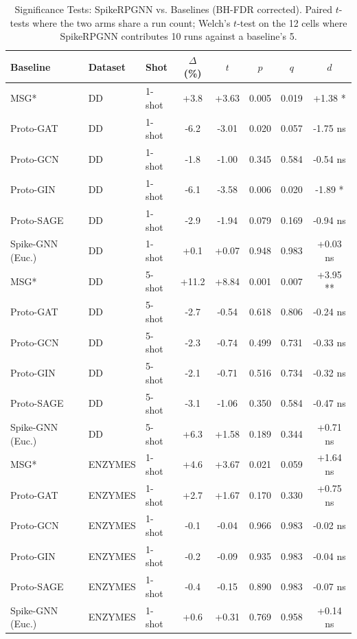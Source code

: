 \begin{table}[htbp]
\caption{Significance Tests: SpikeRPGNN vs. Baselines (BH-FDR corrected). Paired $t$-tests where the two arms share a run count; Welch's $t$-test on the 12 cells where SpikeRPGNN contributes 10 runs against a baseline's 5.}
\label{tab:significance}
\centering \scriptsize
\begin{tabular*}{\tblwidth}{@{} LLLccccc @{}}
\toprule
\textbf{Baseline} & \textbf{Dataset} & \textbf{Shot} & $\Delta$(\%) & $t$ & $p$ & $q$ & $d$ \\
\midrule
MSG* & DD & 1-shot & +3.8 & +3.63 & 0.005 & 0.019 & +1.38 * \\
Proto-GAT & DD & 1-shot & -6.2 & -3.01 & 0.020 & 0.057 & -1.75 ns \\
Proto-GCN & DD & 1-shot & -1.8 & -1.00 & 0.345 & 0.584 & -0.54 ns \\
Proto-GIN & DD & 1-shot & -6.1 & -3.58 & 0.006 & 0.020 & -1.89 * \\
Proto-SAGE & DD & 1-shot & -2.9 & -1.94 & 0.079 & 0.169 & -0.94 ns \\
Spike-GNN (Euc.) & DD & 1-shot & +0.1 & +0.07 & 0.948 & 0.983 & +0.03 ns \\
MSG* & DD & 5-shot & +11.2 & +8.84 & 0.001 & 0.007 & +3.95 ** \\
Proto-GAT & DD & 5-shot & -2.7 & -0.54 & 0.618 & 0.806 & -0.24 ns \\
Proto-GCN & DD & 5-shot & -2.3 & -0.74 & 0.499 & 0.731 & -0.33 ns \\
Proto-GIN & DD & 5-shot & -2.1 & -0.71 & 0.516 & 0.734 & -0.32 ns \\
Proto-SAGE & DD & 5-shot & -3.1 & -1.06 & 0.350 & 0.584 & -0.47 ns \\
Spike-GNN (Euc.) & DD & 5-shot & +6.3 & +1.58 & 0.189 & 0.344 & +0.71 ns \\
MSG* & ENZYMES & 1-shot & +4.6 & +3.67 & 0.021 & 0.059 & +1.64 ns \\
Proto-GAT & ENZYMES & 1-shot & +2.7 & +1.67 & 0.170 & 0.330 & +0.75 ns \\
Proto-GCN & ENZYMES & 1-shot & -0.1 & -0.04 & 0.966 & 0.983 & -0.02 ns \\
Proto-GIN & ENZYMES & 1-shot & -0.2 & -0.09 & 0.935 & 0.983 & -0.04 ns \\
Proto-SAGE & ENZYMES & 1-shot & -0.4 & -0.15 & 0.890 & 0.983 & -0.07 ns \\
Spike-GNN (Euc.) & ENZYMES & 1-shot & +0.6 & +0.31 & 0.769 & 0.958 & +0.14 ns \\

\end{tabular*}
\end{table}
